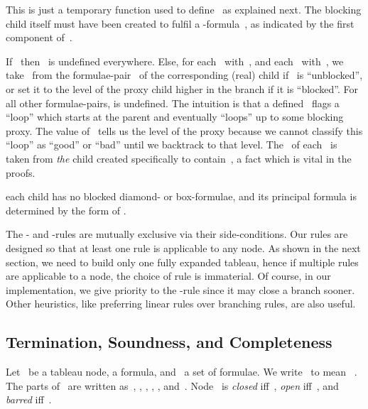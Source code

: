 \documentclass{entcs}
\newcommand{\fea}{}
\newcommand{\trid}{}
\newcommand{\trea}{}
\begin{document}
\begin{center}
\begin{description}
  This is just a temporary function
  used to define~ as explained next.
  The blocking child itself must have been created
  to fulfil a \fea{}-formula~,
  as indicated by the first component of~.
\item[\rm :]
  If~ then~ is undefined everywhere.
  Else,
  for each~ with~,
  and each~ with~,
  we take~
  from the formulae-pair~ of the corresponding (real) child
  if~ is ``unblocked'',
  or set it to the level of the proxy child higher in the branch
  if it is ``blocked''.
  For all other formulae-pairs,  is undefined.
  The intuition is that a defined~ flags
  a ``loop'' which starts at the parent
  and eventually ``loops'' up to some blocking proxy.
  The value of~ tells us the level of the proxy
  because we cannot classify this ``loop'' as ``good'' or ``bad''
  until we backtrack to that level.
  The~ of each~ is taken from \emph{the} child
  created specifically to contain~,
  a fact which is vital in the proofs.
\item[\rm :]
  each child has no blocked diamond- or box-formulae,
  and its principal formula is determined by the form of .
\end{description}

The \trea{}- and \trid{}-rules are mutually exclusive via their
side-conditions.  Our rules are designed so that at least one rule is
applicable to any node. As shown in the next section, we need to build
only one fully expanded tableau, hence if multiple rules are
applicable to a node, the choice of rule is immaterial.
Of course, in our implementation, we give priority to the \trid{}-rule
since it may close a branch sooner. Other heuristics, like preferring
linear rules over branching rules, are also useful.

\subsection{Termination, Soundness, and Completeness}

\begin{definition}
  Let~ be a tableau node,
   a formula, and~ a set of formulae.
  We write~  to mean~ .
  The parts of~
  are written as~, , , , , and~.
  Node~ is \emph{closed} iff~,
  \emph{open} iff~, and \emph{barred} iff~.
\end{definition}


\end{center}
\end{document}
